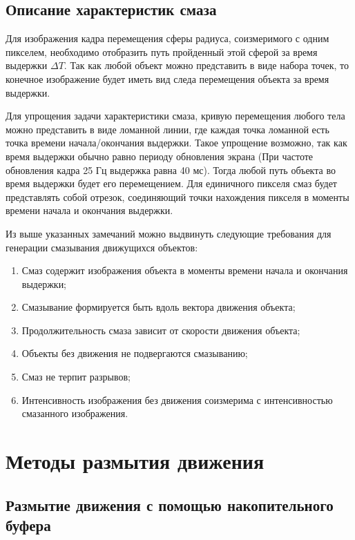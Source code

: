 \subsection{Описание характеристик смаза}
\label{cha:analysis_charestic}
Для изображения кадра перемещения сферы радиуса, соизмеримого с одним пикселем, необходимо отобразить путь пройденный этой сферой за время выдержки $\Delta T$. Так как любой объект можно представить в виде набора точек, то конечное изображение будет иметь вид следа перемещения объекта за время выдержки.
\par
Для упрощения задачи характеристики смаза, кривую перемещения любого тела можно представить в виде ломанной линии, где каждая точка ломанной есть точка времени начала/окончания выдержки. Такое упрощение возможно, так как время выдержки обычно равно периоду обновления экрана (При частоте обновления кадра 25 Гц выдержка равна 40 мс). Тогда любой путь объекта во время выдержки будет его перемещением. Для единичного пикселя смаз будет представлять собой отрезок, соединяющий точки нахождения пикселя в моменты времени начала и окончания выдержки.
\par
Из выше указанных замечаний можно выдвинуть следующие требования для генерации смазывания движущихся объектов:
\begin{enumerate}
    \item Смаз содержит изображения объекта в моменты времени начала и окончания выдержки;
    \item Смазывание формируется быть вдоль вектора движения объекта;
    \item Продолжительность смаза зависит от скорости движения объекта;
    \item Объекты без движения не подвергаются смазыванию;
    \item Смаз не терпит разрывов;
    \item Интенсивность изображения без движения соизмерима с интенсивностью смазанного изображения.
\end{enumerate}

\section{Методы размытия движения}

\subsection{Размытие движения с помощью накопительного буфера}
\label{cha:analysis_acum}

